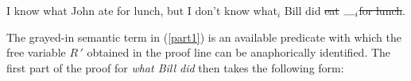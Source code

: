 \documentclass[output=paper,colorlinks,citecolor=brown]{langscibook}
\begin{document}
\begin{exe}
 \ex\label{extractionVPE-rep}
  I know what John ate for lunch,  but I don't know what\ensuremath{_i} Bill did
  \sout{eat}  {\ensuremath{\gp_i}}\xspace \sout{for lunch}.
\end{exe}
\begin{exe}
 \ex\label{part1}
\end{exe}

\noindent The grayed-in semantic term in (\ref{part1}) is an available predicate
with which the free variable $R\,'$ obtained in the proof line 
can be anaphorically identified. The first part of the proof for \textit{what
Bill did} then takes the following form:
\end{document}
